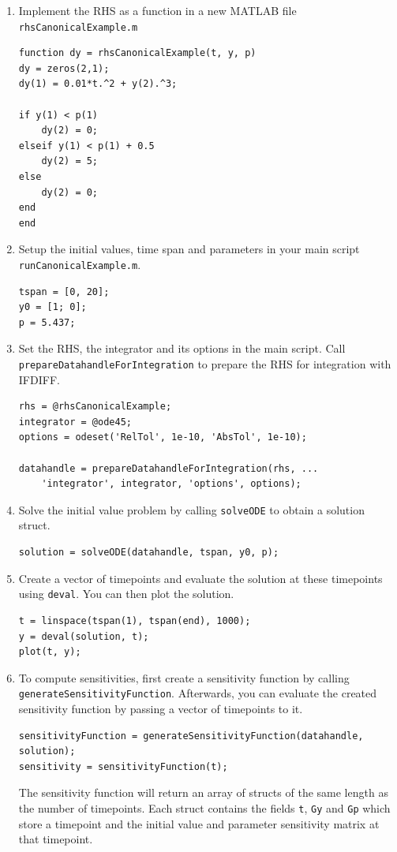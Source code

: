\begin{enumerate}
	\item Implement the RHS as a function in a new MATLAB file \texttt{rhsCanonicalExample.m}
	\begin{lstlisting}
function dy = rhsCanonicalExample(t, y, p)
dy = zeros(2,1);
dy(1) = 0.01*t.^2 + y(2).^3;

if y(1) < p(1)
    dy(2) = 0;
elseif y(1) < p(1) + 0.5
    dy(2) = 5;
else
    dy(2) = 0;
end
end
	\end{lstlisting}

	\item Setup the initial values, time span and parameters in your main script \texttt{runCanonicalExample.m}.
	\begin{lstlisting}
tspan = [0, 20];
y0 = [1; 0];
p = 5.437;
	\end{lstlisting}

	\item Set the RHS, the integrator and its options in the main script. Call \lstinline|prepareDatahandleForIntegration| to prepare the RHS for integration with IFDIFF.
	\begin{lstlisting}
rhs = @rhsCanonicalExample;
integrator = @ode45;
options = odeset('RelTol', 1e-10, 'AbsTol', 1e-10);

datahandle = prepareDatahandleForIntegration(rhs, ...
    'integrator', integrator, 'options', options);
	\end{lstlisting}

	\item Solve the initial value problem by calling \lstinline|solveODE| to obtain a solution struct.
	\begin{lstlisting}
solution = solveODE(datahandle, tspan, y0, p);
	\end{lstlisting}

	\item Create a vector of timepoints and evaluate the solution at these timepoints using \lstinline|deval|. You can then plot the solution.
	\begin{lstlisting}
t = linspace(tspan(1), tspan(end), 1000);
y = deval(solution, t);
plot(t, y);
	\end{lstlisting}
	\item To compute sensitivities, first create a sensitivity function by calling \lstinline|generateSensitivityFunction|. Afterwards, you can evaluate the created sensitivity function by passing a vector of timepoints to it.
	\begin{lstlisting}
sensitivityFunction = generateSensitivityFunction(datahandle, solution);
sensitivity = sensitivityFunction(t);
	\end{lstlisting}
	The sensitivity function will return an array of structs of the same length as the number of timepoints. Each struct contains the fields \lstinline|t|, \lstinline|Gy| and \lstinline|Gp| which store a timepoint and the initial value and parameter sensitivity matrix at that timepoint.
	

\end{enumerate}
